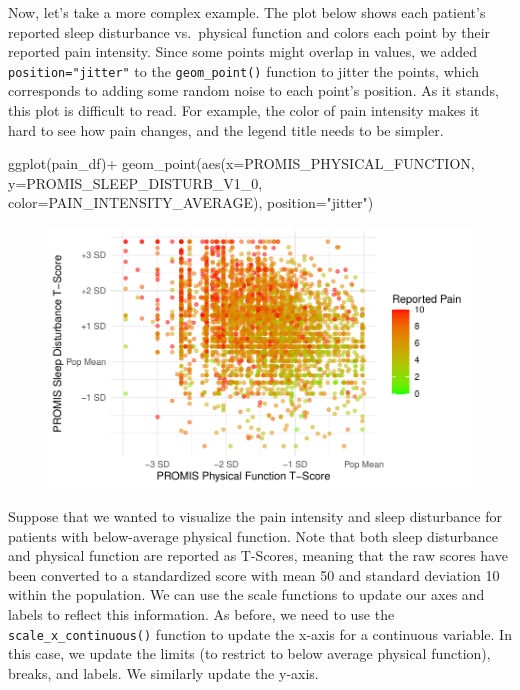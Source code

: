 \documentclass[
  letterpaper,
]{krantz}
\makeatletter
\newenvironment{Shaded}{\begin{snugshade}}{\end{snugshade}}
\newcommand{\AttributeTok}[1]{\textcolor[rgb]{0.40,0.45,0.13}{#1}}
\newcommand{\FunctionTok}[1]{\textcolor[rgb]{0.28,0.35,0.67}{#1}}
\newcommand{\NormalTok}[1]{\textcolor[rgb]{0.00,0.23,0.31}{#1}}
\newcommand{\SpecialCharTok}[1]{\textcolor[rgb]{0.37,0.37,0.37}{#1}}
\newcommand{\StringTok}[1]{\textcolor[rgb]{0.13,0.47,0.30}{#1}}
\newenvironment{kframe}{%
\medskip{}
\setlength{\fboxsep}{.8em}
 \def\at@end@of@kframe{}%
 \ifinner\ifhmode%
  \def\at@end@of@kframe{\end{minipage}}%
  \begin{minipage}{\columnwidth}%
 \fi\fi%
 \def\FrameCommand##1{\hskip\@totalleftmargin \hskip-\fboxsep
 \colorbox{shadecolor}{##1}\hskip-\fboxsep
     \hskip-\linewidth \hskip-\@totalleftmargin \hskip\columnwidth}%
 \MakeFramed {\advance\hsize-\width
   \@totalleftmargin\z@ \linewidth\hsize
   \@setminipage}}%
 {\par\unskip\endMakeFramed%
 \at@end@of@kframe}
\renewenvironment{Shaded}{\begin{kframe}}{\end{kframe}}
\makeatother
\begin{document}
Now, let's take a more complex example. The plot below shows each
patient's reported sleep disturbance vs.~physical function and colors
each point by their reported pain intensity. Since some points might
overlap in values, we added \texttt{position="jitter"} to the
\texttt{geom\_point()} function to jitter the points, which corresponds
to adding some random noise to each point's position. As it stands, this
plot is difficult to read. For example, the color of pain intensity
makes it hard to see how pain changes, and the legend title needs to be
simpler.

\begin{Shaded}
\begin{Highlighting}[]
\FunctionTok{ggplot}\NormalTok{(pain\_df)}\SpecialCharTok{+}
  \FunctionTok{geom\_point}\NormalTok{(}\FunctionTok{aes}\NormalTok{(}\AttributeTok{x=}\NormalTok{PROMIS\_PHYSICAL\_FUNCTION, }\AttributeTok{y=}\NormalTok{PROMIS\_SLEEP\_DISTURB\_V1\_0, }
                 \AttributeTok{color=}\NormalTok{PAIN\_INTENSITY\_AVERAGE), }\AttributeTok{position=}\StringTok{"jitter"}\NormalTok{)}
\end{Highlighting}
\end{Shaded}

\begin{figure}[H]

{\centering \includegraphics[width=1\textwidth,height=\textheight]{book/7_visualization_ggplot_files/figure-pdf/unnamed-chunk-9-1.pdf}

}

\end{figure}

Suppose that we wanted to visualize the pain intensity and sleep
disturbance for patients with below-average physical function. Note that
both sleep disturbance and physical function are reported as T-Scores,
meaning that the raw scores have been converted to a standardized score
with mean 50 and standard deviation 10 within the population. We can use
the scale functions to update our axes and labels to reflect this
information. As before, we need to use the
\texttt{scale\_x\_continuous()} function to update the x-axis for a
continuous variable. In this case, we update the limits (to restrict to
below average physical function), breaks, and labels. We similarly
update the y-axis.
\end{document}
